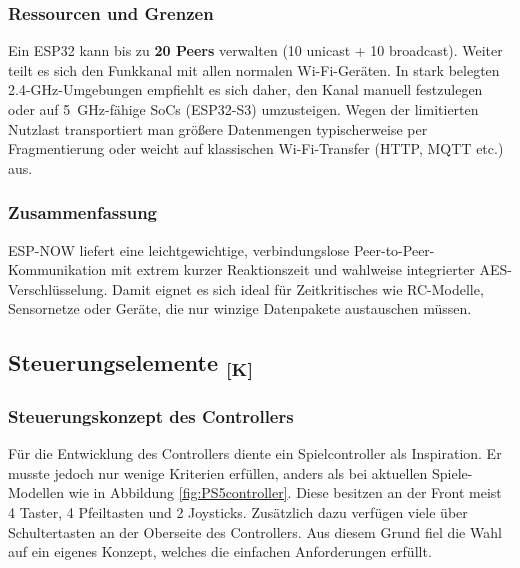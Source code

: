 \documentclass[a4paper,12pt]{article}
\begin{document}
\subsubsection*{Ressourcen und Grenzen}
Ein ESP32 kann bis zu \textbf{20 Peers} verwalten (10 unicast + 10 broadcast). Weiter teilt es sich den Funkkanal mit allen normalen Wi-Fi-Geräten. In stark belegten 2.4-GHz-Umgebungen empfiehlt es sich daher, den Kanal manuell festzulegen oder auf \SI{5}{GHz}-fähige SoCs (ESP32-S3) umzusteigen. Wegen der limitierten Nutzlast transportiert man größere Datenmengen typischerweise per Fragmentierung oder weicht auf klassischen Wi-Fi-Transfer (HTTP, MQTT etc.) aus.

\subsubsection*{Zusammenfassung}%
ESP-NOW liefert eine leichtgewichtige, verbindungslose Peer-to-Peer-Kommunikation mit extrem kurzer Reaktionszeit und wahlweise integrierter AES-Verschlüsselung.  Damit eignet es sich ideal für Zeitkritisches wie RC-Modelle, Sensornetze oder Geräte, die nur winzige Datenpakete austauschen müssen. 

\newpage
\subsection{\texorpdfstring{Steuerungselemente \textsubscript{[K]}}{Steuerungselemente [K]}}
\label{sec:Steuerungselemente}

\subsubsection{Steuerungskonzept des Controllers}
Für die Entwicklung des Controllers diente ein Spielcontroller als Inspiration. Er musste jedoch nur wenige Kriterien erfüllen, anders als bei aktuellen Spiele-Modellen wie in Abbildung \ref{fig:PS5controller}. Diese besitzen an der Front meist 4 Taster, 4 Pfeiltasten und 2 Joysticks. Zusätzlich dazu verfügen viele über Schultertasten an der Oberseite des Controllers. Aus diesem Grund fiel die Wahl auf ein eigenes Konzept, welches die einfachen Anforderungen erfüllt. 

\end{document}
